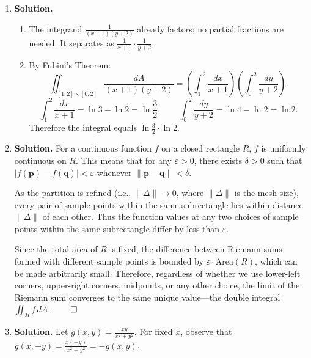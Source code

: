 \begin{enumerate}
At $y=3$: $3\ln 10-6+2\arctan 3$.

At $y=2$: $2\ln 5-4+2\arctan 2$.

Difference: $3\ln 10-2\ln 5-2+2(\arctan 3-\arctan 2)$.

Combining:
\[
\boxed{\frac{1}{2}\Bigl[3\ln\tfrac{11}{10} - 2\ln\tfrac{6}{5} + 2\sqrt{2}\bigl(\arctan\tfrac{3}{\sqrt{2}}-\arctan\sqrt{2}\bigr) - 2(\arctan 3 - \arctan 2)\Bigr]}.
\]

\item \textbf{Solution.}

\begin{enumerate}
\item The integrand $\frac{1}{(x+1)(y+2)}$ already factors; no partial fractions are needed. It separates as $\frac{1}{x+1}\cdot\frac{1}{y+2}$.

\item By Fubini's Theorem:
\[
\iint_{[1,2]\times[0,2]}\frac{dA}{(x+1)(y+2)} = \left(\int_1^2\frac{dx}{x+1}\right)\!\left(\int_0^2\frac{dy}{y+2}\right).
\]
\[
\int_1^2\frac{dx}{x+1} = \ln 3 - \ln 2 = \ln\frac{3}{2}, \qquad \int_0^2\frac{dy}{y+2} = \ln 4 - \ln 2 = \ln 2.
\]
Therefore the integral equals $\boxed{\ln\frac{3}{2}\cdot\ln 2}$.
\end{enumerate}

\item \textbf{Solution.}
For a continuous function $f$ on a closed rectangle $R$, $f$ is uniformly continuous on $R$. This means that for any $\varepsilon > 0$, there exists $\delta > 0$ such that $|f(\mathbf{p}) - f(\mathbf{q})| < \varepsilon$ whenever $\|\mathbf{p} - \mathbf{q}\| < \delta$.

As the partition is refined (i.e., $\|\Delta\| \to 0$, where $\|\Delta\|$ is the mesh size), every pair of sample points within the same subrectangle lies within distance $\|\Delta\|$ of each other. Thus the function values at any two choices of sample points within the same subrectangle differ by less than $\varepsilon$.

Since the total area of $R$ is fixed, the difference between Riemann sums formed with different sample points is bounded by $\varepsilon \cdot \text{Area}(R)$, which can be made arbitrarily small. Therefore, regardless of whether we use lower-left corners, upper-right corners, midpoints, or any other choice, the limit of the Riemann sum converges to the same unique value---the double integral $\iint_R f\,dA$. $\qed$

\item \textbf{Solution.}
Let $g(x,y) = \frac{xy}{x^2+y^2}$. For fixed $x$, observe that $g(x,-y) = \frac{x(-y)}{x^2+y^2} = -g(x,y)$.


\end{enumerate}
